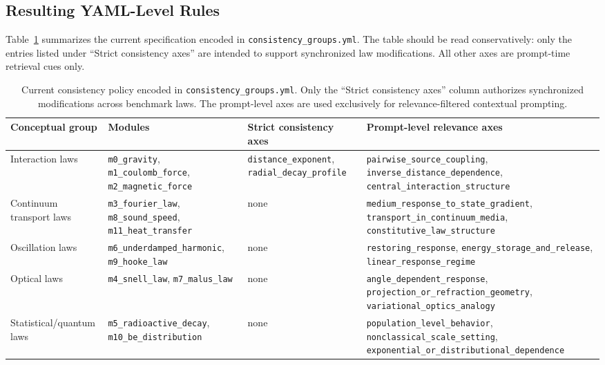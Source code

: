 \subsection{Resulting YAML-Level Rules}

Table~\ref{tab:consistency-groups} summarizes the current specification encoded in \texttt{consistency\_groups.yml}. The table should be read conservatively: only the entries listed under ``Strict consistency axes'' are intended to support synchronized law modifications. All other axes are prompt-time retrieval cues only.

\begin{table}[t]
\centering
\small
\begin{tabular}{p{3.0cm} p{4.7cm} p{3.9cm} p{4.8cm}}
\hline
\textbf{Conceptual group} & \textbf{Modules} & \textbf{Strict consistency axes} & \textbf{Prompt-level relevance axes} \\
\hline
Interaction laws &
\texttt{m0\_gravity}, \texttt{m1\_coulomb\_force}, \texttt{m2\_magnetic\_force} &
\texttt{distance\_exponent}, \texttt{radial\_decay\_profile} &
\texttt{pairwise\_source\_coupling}, \texttt{inverse\_distance\_dependence}, \texttt{central\_interaction\_structure} \\

Continuum transport laws &
\texttt{m3\_fourier\_law}, \texttt{m8\_sound\_speed}, \texttt{m11\_heat\_transfer} &
none &
\texttt{medium\_response\_to\_state\_gradient}, \texttt{transport\_in\_continuum\_media}, \texttt{constitutive\_law\_structure} \\

Oscillation laws &
\texttt{m6\_underdamped\_harmonic}, \texttt{m9\_hooke\_law} &
none &
\texttt{restoring\_response}, \texttt{energy\_storage\_and\_release}, \texttt{linear\_response\_regime} \\

Optical laws &
\texttt{m4\_snell\_law}, \texttt{m7\_malus\_law} &
none &
\texttt{angle\_dependent\_response}, \texttt{projection\_or\_refraction\_geometry}, \texttt{variational\_optics\_analogy} \\

Statistical/quantum laws &
\texttt{m5\_radioactive\_decay}, \texttt{m10\_be\_distribution} &
none &
\texttt{population\_level\_behavior}, \texttt{nonclassical\_scale\_setting}, \texttt{exponential\_or\_distributional\_dependence} \\
\hline
\end{tabular}
\caption{Current consistency policy encoded in \texttt{consistency\_groups.yml}. Only the ``Strict consistency axes'' column authorizes synchronized modifications across benchmark laws. The prompt-level axes are used exclusively for relevance-filtered contextual prompting.}
\label{tab:consistency-groups}
\end{table}

